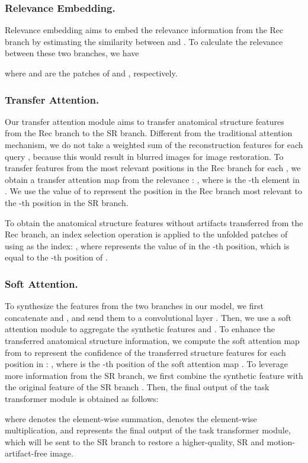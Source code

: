 \documentclass[runningheads]{llncs}
\begin{document}
\subsubsection{Relevance Embedding.}
Relevance embedding aims to embed the relevance information from the Rec branch by estimating the similarity between  and . To calculate the relevance  between these two branches, we have

where  and  are the patches of  and , respectively.

\subsubsection{Transfer Attention.}
Our transfer attention module aims to transfer anatomical structure features from the Rec branch to the SR branch. Different from the traditional attention mechanism, we do not take a weighted sum of the reconstruction features for each query , because this would result in blurred images for image restoration. To transfer features from the most relevant positions in the Rec branch for each , we obtain a transfer attention map  from the relevance : , where  is the -th element in . We use the value of  to represent the position in the Rec branch most relevant to the -th position in the SR branch. 

To obtain the anatomical structure features  without artifacts transferred from the Rec branch, an index selection operation is applied to the unfolded patches of  using  as the index: , where  represents the value of  in the -th position, which is equal to the -th position of .

\subsubsection{Soft Attention.}
To synthesize the features from the two branches in our model, we first concatenate  and , and send them to a convolutional layer . Then, we use a soft attention module to aggregate the synthetic features  and . To enhance the transferred anatomical structure information, we compute the soft attention map  from  to represent the confidence of the transferred structure features for each position in : , where  is the -th position of the soft attention map . To leverage more information from the SR branch, we first combine the synthetic feature  with the original feature of the SR branch . Then, the final output of the task transformer module is obtained as follows:

where  denotes the element-wise summation,  denotes the element-wise multiplication, and  represents the final output of the task transformer module, which will be sent to the SR branch to restore a higher-quality, SR and motion-artifact-free image.
\end{document}
